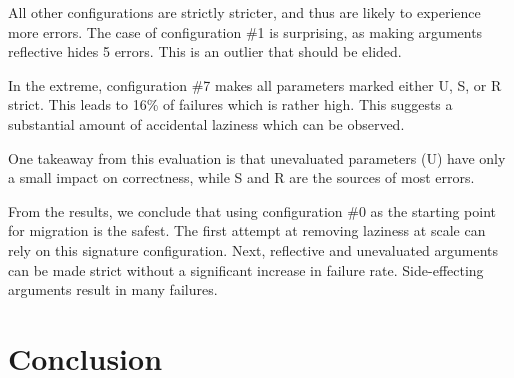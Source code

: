 \documentclass[review,creen,acmsmall]{acmart}
\newcommand{\config}[1]{configuration \#{#1}}
\begin{document}
All other configurations are strictly stricter, and thus are likely to experience
more errors. The case of \config 1 is surprising, as making arguments reflective
hides 5 errors. This is an outlier that should be elided.

In the extreme, \config 7 makes all parameters marked either U, S, or R strict.
This leads to 16\% of failures which is rather high. This suggests a substantial
amount of accidental laziness which can be observed.

One takeaway from this evaluation is that unevaluated parameters (U) have only a
small impact on correctness, while S and R are the sources of most errors.

From the results, we conclude that using \config 0 as the starting point for
migration is the safest. The first attempt at removing laziness at scale can rely on
this signature configuration. Next, reflective and unevaluated arguments can be
made strict without a significant increase in failure rate. Side-effecting
arguments result in many failures.

\section{Conclusion}\label{sec:conclusion}
\end{document}
